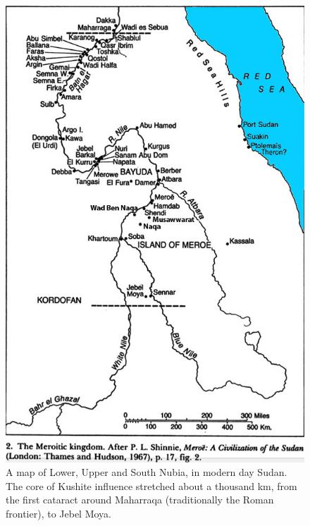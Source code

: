 \documentclass[a4paper,12pt]{scrreprt}
\begin{document}
\begin{figure}[H]
	\centering
	\includegraphics[width=\textwidth]{img/map_of_kush}
	\caption{A map of Lower, Upper and South Nubia, in modern day Sudan. The core of Kushite influence stretched about a thousand km, from the first cataract around Maharraqa (traditionally the Roman frontier), to Jebel Moya.}
\end{figure}
\end{document}
